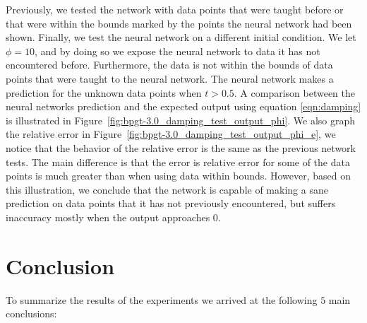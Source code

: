 \documentclass[11pt]{article}
\begin{document}
Previously, we tested the network with data points that were taught before or that were within the bounds marked by the points the
neural network had been shown. Finally, we test the neural network on a different initial condition. We let $\phi=10$, and by doing so
we expose the neural network to data it has not encountered before. Furthermore, the data is not within the bounds of data points that
were taught to the neural network. The neural network makes a prediction for the unknown data points when $t > 0.5$. A comparison
between the neural networks prediction and the expected output using equation \ref{eqn:damping} is illustrated in
Figure~\ref{fig:bpgt-3.0_damping_test_output_phi}. We also graph the relative error in
Figure~\ref{fig:bpgt-3.0_damping_test_output_phi_e}, we notice that the behavior of the relative error is the same as the previous
network tests. The main difference is that the error is relative error for some of the data points is much greater than when using data
within bounds. However, based on this illustration, we conclude that the network is capable of making a sane prediction on data points
that it has not previously encountered, but suffers inaccuracy mostly when the output approaches $0$.



\section{Conclusion} %
\label{sec:conclusion}

To summarize the results of the experiments we arrived at the following $5$ main conclusions:
\end{document}
